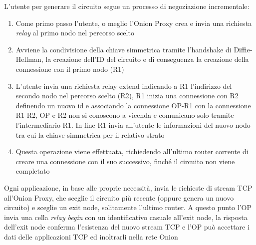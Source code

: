 L'utente per generare il circuito segue un processo di negoziazione incrementale:
\begin{enumerate}
    \item Come primo passo l'utente, o meglio l'Onion Proxy crea e invia una richiesta \emph{relay} al primo nodo nel percorso scelto
    \item Avviene la condivisione della chiave simmetrica tramite l'handshake di Diffie-Hellman, la creazione dell'ID del circuito e di conseguenza la creazione della connessione con il primo nodo (R1)
    \item L'utente invia una richiesta relay extend indicando a R1 l'indirizzo del secondo nodo nel percorso scelto (R2), R1 inizia una connessione con R2 definendo un nuovo id e associando la connessione OP-R1 con la connessione R1-R2, OP e R2 non si conoscono a vicenda e comunicano solo tramite l'intermediario R1. In fine R1 invia all'utente le informazioni del nuovo nodo tra cui la chiave simmetrica per il relativo strato
    \item Questa operazione viene effettuata, richiedendo all'ultimo router corrente di creare una connessione con il suo successivo, finché il circuito non viene completato\cite{ChaumMixes}
\end{enumerate}
Ogni applicazione, in base alle proprie necessità, invia le richieste di stream TCP all'Onion Proxy, che sceglie il circuito più recente (oppure genera un nuovo circuito) e sceglie un exit node, solitamente l'ultimo router. 
A questo punto l'OP invia una cella \emph{relay begin} con un identificativo casuale all'exit node, la risposta dell'exit node conferma l'esistenza del nuovo stream TCP e l'OP può accettare i dati delle applicazioni TCP ed inoltrarli nella rete Onion \\

